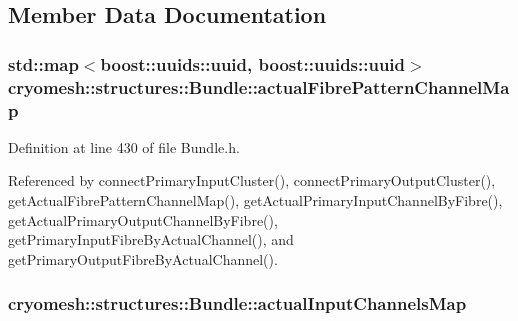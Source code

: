 \subsection{\-Member \-Data \-Documentation}
\hypertarget{classcryomesh_1_1structures_1_1Bundle_a0f3e20833ce850f97ae450d27a4607dd}{
\subsubsection[{actual\-Fibre\-Pattern\-Channel\-Map}]{\setlength{\rightskip}{0pt plus 5cm}std\-::map$<$boost\-::uuids\-::uuid, boost\-::uuids\-::uuid$>$ {\bf cryomesh\-::structures\-::\-Bundle\-::actual\-Fibre\-Pattern\-Channel\-Map}}}\label{classcryomesh_1_1structures_1_1Bundle_a0f3e20833ce850f97ae450d27a4607dd}


\-Definition at line 430 of file \-Bundle.\-h.



\-Referenced by connect\-Primary\-Input\-Cluster(), connect\-Primary\-Output\-Cluster(), get\-Actual\-Fibre\-Pattern\-Channel\-Map(), get\-Actual\-Primary\-Input\-Channel\-By\-Fibre(), get\-Actual\-Primary\-Output\-Channel\-By\-Fibre(), get\-Primary\-Input\-Fibre\-By\-Actual\-Channel(), and get\-Primary\-Output\-Fibre\-By\-Actual\-Channel().

\hypertarget{classcryomesh_1_1structures_1_1Bundle_ae20b2f9819708971357148dd024db00d}{
\subsubsection[{actual\-Input\-Channels\-Map}]{ {\bf cryomesh\-::structures\-::\-Bundle\-::actual\-Input\-Channels\-Map}}}\label{classcryomesh_1_1structures_1_1Bundle_ae20b2f9819708971357148dd024db00d}


